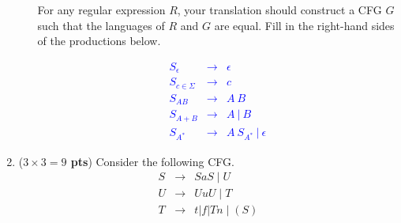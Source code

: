 \documentclass[10pt]{exam}
\newcommand {\pts}[1]{({\bf #1 pts})}
\begin{document}
\begin{enumerate}
\begin{enumerate}
                For any regular expression $R$, your translation should construct a CFG $G$ such that the languages of
                $R$ and $G$ are equal. Fill in the right-hand sides of the productions below.

                \textcolor{blue}{\[
                    \begin{array}{cll}
                      S_{\epsilon}     & \rightarrow & \epsilon                  \\
                      S_{c \in \Sigma} & \rightarrow & c                         \\
                      S_{A B}          & \rightarrow & A\ B                      \\
                      S_{A+B}          & \rightarrow & A\ |\ B                   \\
                      S_{A^{*}}        & \rightarrow & A\ S_{A^{*}}\ |\ \epsilon
                    \end{array}
                  \]}

        \end{enumerate}



  \item \pts{$3\times 3= 9$} Consider the following CFG.
        \[\begin{array}{cll}
            S & \rightarrow & S a S \mid U     \\
            U & \rightarrow & U u U \mid T     \\
            T & \rightarrow & t|f| T n \mid(S) \\
          \end{array}\]


\end{enumerate}
\end{document}
